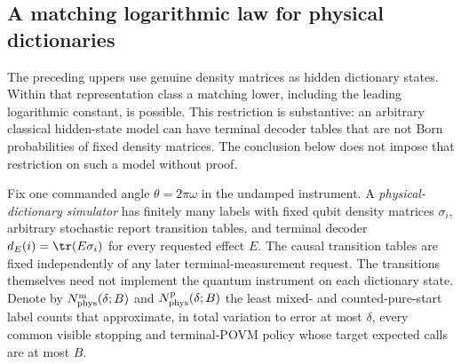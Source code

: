 \subsection{A matching logarithmic law for physical dictionaries}
\label{sec:r76-physical-approximation}

The preceding uppers use genuine density matrices as hidden dictionary
states.  Within that representation class a matching lower, including
the leading logarithmic constant, is possible.  This restriction is
substantive: an arbitrary classical hidden-state model can have terminal
decoder tables that are not Born probabilities of fixed density matrices.
The conclusion below does not impose that restriction on such a model
without proof.

Fix one commanded angle $\theta=2\pi\omega$ in the undamped instrument.
A \emph{physical-dictionary simulator} has finitely many labels with
fixed qubit density matrices $\sigma_i$, arbitrary stochastic report
transition tables, and terminal decoder
$d_E(i)=\tr(E\sigma_i)$ for every requested effect $E$.
The causal transition tables are fixed independently of any later
terminal-measurement request.
The transitions themselves need not implement the quantum instrument on
each dictionary state.  Denote by $N_{\rm phys}^{\rm m}(\delta;B)$ and
$N_{\rm phys}^{\rm p}(\delta;B)$ the least mixed- and counted-pure-start
label counts that approximate, in total variation to error at most
$\delta$, every common visible stopping and terminal-POVM policy whose
target expected calls are at most $B$.

